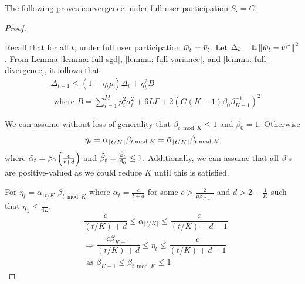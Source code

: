 The following proves convergence under full user participation $S_\cdot = C$.
\begin{proof}
\label{pf: full}

    Recall that for all $t$, under full user participation $\Bar{w}_t = \Bar{v}_t$. Let $\Delta_t = \mathbb{E} \left\lVert\Bar{w}_t - w^*\right\rVert^2$. From Lemma \ref{lemma: full-sgd}, \ref{lemma: full-variance}, and \ref{lemma: full-divergence}, it follows that
    \begin{align*}
        & \Delta_{t + 1} \leq \left( 1 - \eta_t \mu \right) \Delta_t + \eta_t^2 B \\
        & \textrm{ where } B = \sum_{i = 1}^M p_i^2 \sigma_i^2 + 6 L \Gamma + 2 \left( G (K - 1) \beta_0 \beta_{K - 1}^{-1} \right)^2
    \end{align*}
    
    We can assume without loss of generality that $\beta_{t \bmod K} \leq 1$ and $\beta_0 = 1$. Otherwise 
    \begin{align*}
        \eta_t = \alpha_{\lfloor t/K \rfloor} \beta_{t \bmod K} = \Tilde{\alpha}_{\lfloor t/K \rfloor} \Tilde{\beta}_{t \bmod K}
    \end{align*} 
    where $\Tilde{\alpha}_t = \beta_0 \left( \frac{c}{t + d} \right)$ and $\Tilde{\beta}_t = \frac{\beta_t}{\beta_0} \leq 1$. Additionally, we can assume that all $\beta$'s are positive-valued as we could reduce $K$ until this is satisfied.
    
    For $\eta_t = \alpha_{\lfloor t/K \rfloor} \beta_{t \bmod K}$ where $\alpha_t = \frac{c}{t + d}$ for some $c > \frac{2}{\mu \beta_{K - 1}}$ and $d > 2 - \frac{1}{K}$ such that $\eta_1 \leq \frac{1}{4L}$. 
    \begin{align*}
        & \dfrac{c}{(t/K) + d} \leq \alpha_{\lfloor t/K \rfloor} \leq \dfrac{c}{(t/K) + d - 1} \\
        & \Rightarrow \dfrac{c \beta_{K - 1}}{(t/K) + d} \leq \eta_t \leq \dfrac{c}{(t/K) + d - 1} \\
        & \textrm{ as } \beta_{K - 1} \leq \beta_{t \bmod K} \leq 1 
    \end{align*}
    

\end{proof}
